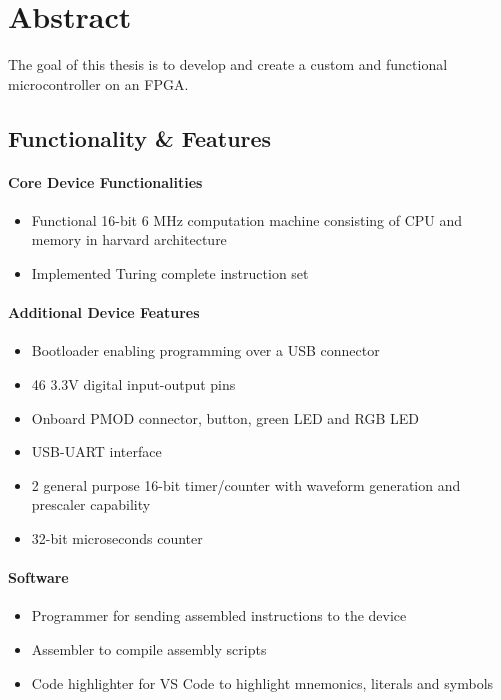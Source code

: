 \section*{Abstract}
The goal of this thesis is to develop and create a custom and functional microcontroller on an FPGA.

\subsection*{Functionality \& Features}

\paragraph{Core Device Functionalities}
\begin{itemize}
    \item Functional 16-bit 6 MHz computation machine consisting of CPU and memory in harvard architecture
    \item Implemented Turing complete instruction set
\end{itemize}

\paragraph{Additional Device Features}
\begin{itemize}
    \item Bootloader enabling programming over a USB connector
    \item 46 3.3V digital input-output pins
    \item Onboard PMOD connector, button, green LED and RGB LED
    \item USB-UART interface
    \item 2 general purpose 16-bit timer/counter with waveform generation and prescaler capability
    \item 32-bit microseconds counter
\end{itemize}

\paragraph{Software}
\begin{itemize}
    \item Programmer for sending assembled instructions to the device
    \item Assembler to compile assembly scripts
    \item Code highlighter for VS Code to highlight mnemonics, literals and symbols
\end{itemize}

